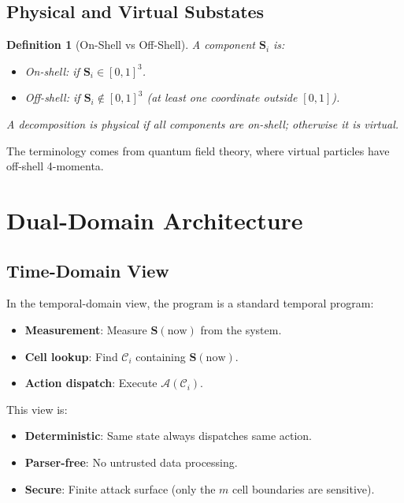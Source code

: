 \documentclass[twocolumn,11pt,a4paper]{article}
\newtheorem{definition}[theorem]{Definition}
\newcommand{\Stuple}{\mathbf{S}}
\newcommand{\calC}{\mathcal{C}}
\begin{document}
\subsection{Physical and Virtual Substates}

\begin{definition}[On-Shell vs Off-Shell]
A component $\Stuple_i$ is:
\begin{itemize}[nosep,leftmargin=1em]
  \item \emph{On-shell}: if $\Stuple_i \in [0,1]^3$.
  \item \emph{Off-shell}: if $\Stuple_i \notin [0,1]^3$ (at least one coordinate outside $[0,1]$).
\end{itemize}
A decomposition is \emph{physical} if all components are on-shell; otherwise it is \emph{virtual}.
\end{definition}

The terminology comes from quantum field theory, where virtual particles have off-shell 4-momenta.

\section{Dual-Domain Architecture}
\label{sec:dualdom}

\subsection{Time-Domain View}

In the temporal-domain view, the program is a standard temporal program:
\begin{itemize}[nosep,leftmargin=1em]
  \item \textbf{Measurement}: Measure $\Stuple(\text{now})$ from the system.
  \item \textbf{Cell lookup}: Find $\calC_i$ containing $\Stuple(\text{now})$.
  \item \textbf{Action dispatch}: Execute $\mathcal{A}(\calC_i)$.
\end{itemize}

This view is:
\begin{itemize}[nosep,leftmargin=1em]
  \item \textbf{Deterministic}: Same state always dispatches same action.
  \item \textbf{Parser-free}: No untrusted data processing.
  \item \textbf{Secure}: Finite attack surface (only the $m$ cell boundaries are sensitive).
\end{itemize}
\end{document}
